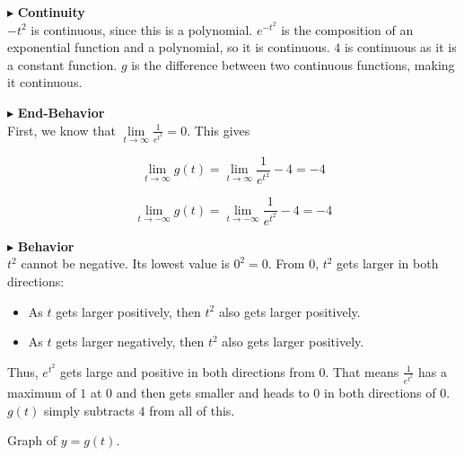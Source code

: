 \documentclass{ximera}
\begin{document}
$\blacktriangleright$  \textbf{\textcolor{blue!55!black}{Continuity}} \\


$-t^2$ is continuous, since this is a polynomial.  $e^{-t^2}$ is the composition of an exponential function and a polynomial, so it is continuous. $4$ is continuous as it is a constant function. $g$ is the difference between two continuous functions, making it continuous.






$\blacktriangleright$  \textbf{\textcolor{blue!55!black}{End-Behavior}} \\

First, we know that $\lim\limits_{t \to \infty}  \frac{1}{e^{t^2}} = 0$.  This gives


\[   \lim\limits_{t \to \infty} g(t) =  \lim\limits_{t \to \infty}  \frac{1}{e^{t^2}} - 4 = -4 \]


\[   \lim\limits_{t \to -\infty} g(t) =  \lim\limits_{t \to -\infty}  \frac{1}{e^{t^2}} - 4 = -4 \]





$\blacktriangleright$  \textbf{\textcolor{blue!55!black}{Behavior}} \\


$t^2$ cannot be negative. Its lowest value is $0^2 = 0$.  From $0$, $t^2$ gets larger in both directions:  


\begin{itemize}
\item As $t$ gets larger positively, then $t^2$ also gets larger positively.
\item As $t$ gets larger negatively, then $t^2$ also gets larger positively.
\end{itemize}

Thus, $e^{t^2}$ gets large and positive in both directions from $0$.  That means  $\frac{1}{e^{t^2}}$ has a maximum of $1$ at $0$ and then gets smaller and heads to $0$ in both directions of $0$. \\

$g(t)$ simply subtracts $4$ from all of this.









Graph of $y = g(t)$.
\end{document}
